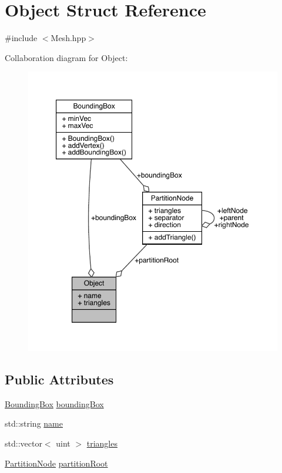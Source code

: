\hypertarget{struct_object}{}\section{Object Struct Reference}
\label{struct_object}


{\ttfamily \#include $<$Mesh.\+hpp$>$}



Collaboration diagram for Object\+:\nopagebreak
\begin{figure}[H]
\begin{center}
\leavevmode
\includegraphics[width=350pt]{struct_object__coll__graph}
\end{center}
\end{figure}
\subsection*{Public Attributes}
\begin{DoxyCompactItemize}
\item 
\hyperlink{struct_bounding_box}{Bounding\+Box} \hyperlink{struct_object_aeeac86f3158968433d8484fb43dc9727}{bounding\+Box}
\item 
std\+::string \hyperlink{struct_object_a24457e0a387492c80594aec7681a2277}{name}
\item 
std\+::vector$<$ uint $>$ \hyperlink{struct_object_a4a7a34b417ea8969e1407e6962c671eb}{triangles}
\item 
\hyperlink{struct_partition_node}{Partition\+Node} \hyperlink{struct_object_a484e6471a6620c2dd98aa3db6ab7a9f5}{partition\+Root}
\end{DoxyCompactItemize}



